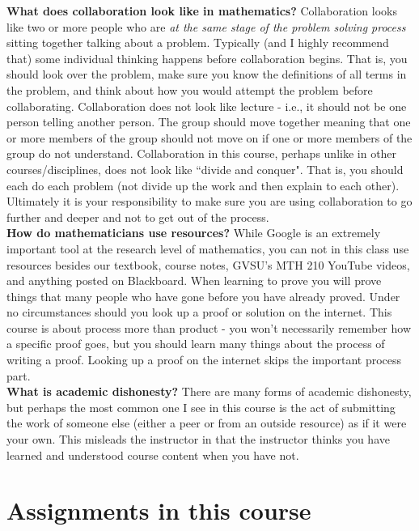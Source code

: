 \documentclass[12pt]{article}
\begin{document}
\noindent\textbf{What does collaboration look like in mathematics?}  Collaboration looks like two or more people who are \emph{at the same stage of the problem solving process} sitting together talking about a problem.  Typically (and I highly recommend that) some individual thinking happens before collaboration begins. That is, you should look over the problem, make sure you know the definitions of all terms in the problem, and think about how you would attempt the problem before collaborating.  Collaboration does not look like lecture - i.e., it should not be one person telling another person.  The group should move together meaning that one or more members of the group should not move on if one or more members of the group do not understand.  Collaboration in this course, perhaps unlike in other courses/disciplines, does not look like ``divide and conquer".  That is, you should each do each problem (not divide up the work and then explain to each other). Ultimately it is your responsibility to make sure you are using collaboration to go further and deeper and not to get out of the process.  \\

\noindent\textbf{How do mathematicians use resources?}  While Google is an extremely important tool at the research level of mathematics, you can not in this class use resources besides our textbook, course notes, GVSU's MTH 210 YouTube videos, and anything posted on Blackboard.  When learning to prove you will prove things that many people who have gone before you have already proved.  Under no circumstances should you look up a proof or solution on the internet.  This course is about process more than product - you won't necessarily remember how a specific proof goes, but you should learn many things about the process of writing a proof.  Looking up a proof on the internet skips the important process part.\\

\noindent\textbf{What is academic dishonesty?}  There are many forms of academic dishonesty, but perhaps the most common one I see in this course is the act of submitting the work of someone else (either a peer or from an outside resource) as if it were your own.  This misleads the instructor in that the instructor thinks you have learned and understood course content when you have not.




\section*{Assignments in this course}
\end{document}
